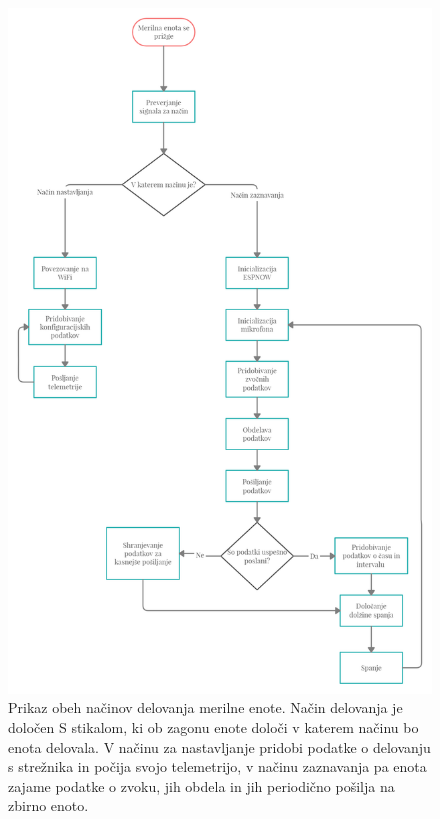 \documentclass[a4paper, 12pt]{book}
\begin{document}
\begin{figure}[H]
    \centering
    \includegraphics[width=\linewidth]{slikovno_gradivo/Merilna enota delovanje (1).png}
    \caption{Prikaz obeh načinov delovanja merilne enote. Način delovanja je določen S stikalom, ki ob zagonu enote določi v katerem načinu bo enota delovala. V načinu za nastavljanje pridobi podatke o delovanju s strežnika in počija svojo telemetrijo, v načinu zaznavanja pa enota zajame podatke o zvoku, jih obdela in jih periodično pošilja na zbirno enoto.}
    \label{fig:potek_mmerilna}
\end{figure}
\end{document}
